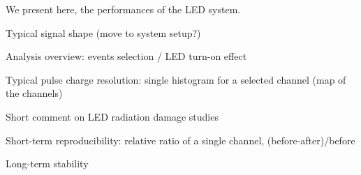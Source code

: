 We present here, the performances of the LED system. 

Typical signal shape (move to system setup?)

Analysis overview: events selection / LED turn-on effect

Typical pulse charge resolution: single histogram for a selected channel (map of the channels)

Short comment on LED radiation damage studies 

Short-term reproducibility: relative ratio of a single channel, (before-after)/before

Long-term stability
